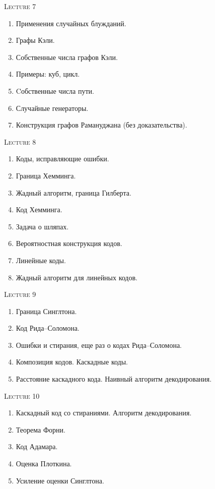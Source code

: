 \centerline{\textsc{Lecture 7}}

\begin{enumerate}
    \item Применения случайных блужданий. 
    \item Графы Кэли. 
    \item Собственные числа графов Кэли. 
    \item Примеры: куб, цикл. 
    \item Cобственные числа пути. 
    \item Случайные генераторы. 
    \item Конструкция графов Рамануджана (без доказательства). 
\end{enumerate}

\centerline{\textsc{Lecture 8} }

\begin{enumerate}
    \item Коды, исправляющие ошибки.
    \item Граница Хемминга.
    \item Жадный алгоритм, граница Гилберта.
    \item Код Хемминга.
    \item Задача о шляпах. 
    \item Вероятностная конструкция кодов.
    \item Линейные коды.
    \item Жадный алгоритм для линейных кодов.
\end{enumerate}


\centerline{\textsc{Lecture 9} }

\begin{enumerate}
    \item Граница Синглтона.
    \item Код Рида--Соломона.
    \item Ошибки и стирания, еще раз о кодах Рида--Соломона.
    \item Композиция кодов. Каскадные коды.
    \item Расстояние каскадного кода. Наивный алгоритм декодирования.
\end{enumerate}

\centerline{\textsc{Lecture 10} }

\begin{enumerate}
    \item Каскадный код со стираниями. Алгоритм декодирования.
    \item Теорема Форни.
    \item Код Адамара.
    \item Оценка Плоткина.
    \item Усиление оценки Синглтона.
\end{enumerate}


